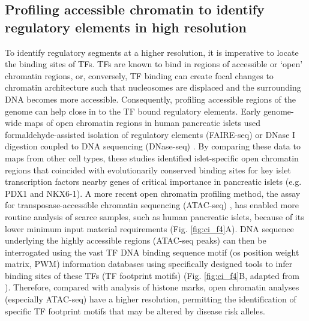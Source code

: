 \subsection{Profiling accessible chromatin to identify regulatory elements in high resolution}
To identify regulatory segments at a higher resolution, it is imperative to locate the binding sites of TFs. TFs are known to bind in regions of accessible or ‘open’ chromatin regions, or, conversely, TF binding can create focal changes to chromatin architecture such that nucleosomes are displaced and the surrounding DNA becomes more accessible. Consequently, profiling accessible regions of the genome can help close in to the TF bound regulatory elements. Early genome-wide maps of open chromatin regions in human pancreatic islets used formaldehyde-assisted isolation of regulatory elements (FAIRE-seq) \cite{gaultonMapOpenChromatin2010} or DNase I digestion coupled to DNA sequencing (DNase-seq) \cite{stitzelGlobalEpigenomicAnalysis2010}. By comparing these data to maps from other cell types, these studies identified islet-specific open chromatin regions that coincided with evolutionarily conserved binding sites for key islet transcription factors nearby genes of critical importance in pancreatic islets (e.g. PDX1 and NKX6-1). A more recent open chromatin profiling method, the assay for transposase-accessible chromatin sequencing (ATAC-seq) \cite{buenrostroATACseqMethodAssaying2015}, has enabled more routine analysis of scarce samples, such as human pancreatic islets, because of its lower minimum input material requirements (Fig. \ref{fig:ci_f4}A). DNA sequence underlying the highly accessible regions (ATAC-seq peaks) can then be interrogated using the vast TF DNA binding sequence motif (os position weight matrix, PWM) information databases \cite{kheradpourSystematicDiscoveryCharacterization2014, mathelierJASPAR2014Extensively2014,sandelinJASPAROpenaccessDatabase2004,jolmaDNABindingSpecificitiesHuman2013} using specifically designed tools \cite{pique-regiAccurateInferenceTranscription2011} to infer binding sites of these TFs (TF footprint motifs) (Fig. \ref{fig:ci_f4}B, adapted from \cite{kyonoGenomicAnnotationDiseaseassociated2019}). Therefore, compared with analysis of histone marks, open chromatin analyses (especially ATAC-seq) have a higher resolution, permitting the identification of specific TF footprint motifs that may be altered by disease risk alleles. 


